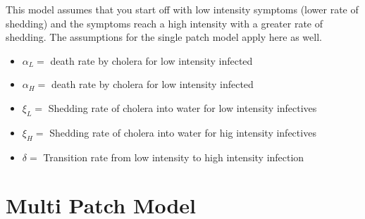 \documentclass[12pt]{article}\usepackage[]{graphicx}\usepackage[]{color}
\begin{document}
This model assumes that you start off with low intensity symptoms (lower rate of shedding) and the symptoms reach a high intensity with a greater rate of shedding. The assumptions for the single patch model apply here as well.
\begin{itemize}
	\item $\alpha_L=$ death rate by cholera for low intensity infected
	\item $\alpha_H=$ death rate by cholera for low intensity infected
    \item $\xi_L=$ Shedding rate of cholera into water for low intensity infectives
    \item $\xi_H=$ Shedding rate of cholera into water for hig intensity infectives
	\item $\delta=$ Transition rate from low intensity to high intensity infection
\end{itemize}

\section{Multi Patch Model}
\end{document}
